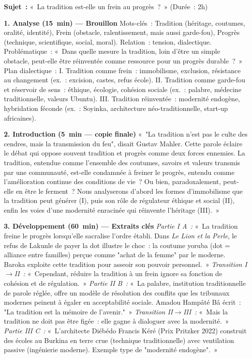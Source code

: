 \documentclass[11pt]{article}
\begin{document}
\begin{exoresolu}
\textbf{Sujet~:} «~La tradition est-elle un frein au progrès~?~» (Durée~: 2h)

\tcblower

\textbf{1. Analyse (15~min) — Brouillon}
Mots-clés~: Tradition (héritage, coutumes, oralité, identité), Frein (obstacle, ralentissement, mais aussi garde-fou), Progrès (technique, scientifique, social, moral). Relation~: tension, dialectique.
Problématique~: «~Dans quelle mesure la tradition, loin d'être un simple obstacle, peut-elle être réinventée comme ressource pour un progrès durable~?~»
Plan dialectique~:
I. Tradition comme frein~: immobilisme, exclusion, résistance au changement (ex.~: excision, castes, refus école).
II. Tradition comme garde-fou et réservoir de sens~: éthique, écologie, cohésion sociale (ex.~: palabre, médecine traditionnelle, valeurs Ubuntu).
III. Tradition réinventée~: modernité endogène, hybridation féconde (ex.~: Soyinka, architecture néo-traditionnelle, start-up africaines).

\textbf{2. Introduction (5~min — copie finale)}
«~"La tradition n'est pas le culte des cendres, mais la transmission du feu", disait Gustav Mahler. Cette parole éclaire le débat qui oppose souvent tradition et progrès comme deux forces ennemies. La tradition, entendue comme l'ensemble des coutumes, savoirs et valeurs transmis par une communauté, est-elle condamnée à freiner le progrès, entendu comme l'amélioration continue des conditions de vie~? Ou bien, paradoxalement, peut-elle en être le ferment~? Nous analyserons d'abord les formes d'immobilisme que la tradition peut générer (I), puis son rôle de régulateur éthique et social (II), enfin les voies d'une modernité enracinée qui réinvente l'héritage (III).~»

\textbf{3. Développement (60~min) — Extraits clés}
\textit{Partie I A~:} «~La tradition freine le progrès lorsqu'elle sacralise l'ordre établi. Dans \emph{Le Lion et la Perle}, le refus de Lakunle de payer la dot illustre le choc~: la coutume yoruba (dot = alliance entre familles) perçue comme "achat de la femme" par le moderne. Baroka exploite cette tradition pour asseoir son pouvoir personnel.~»
\textit{Transition I$\rightarrow$II~:} «~Cependant, réduire la tradition à un frein ignore sa fonction de cohésion et de régulation.~»
\textit{Partie II B~:} «~La palabre, institution traditionnelle de parole réglée, offre un modèle de résolution des conflits que les tribunaux modernes peinent à égaler en acceptabilité sociale. Amadou Hampâté Bâ écrit~: "La tradition est la mémoire de l'avenir."~»
\textit{Transition II$\rightarrow$III~:} «~Mais la tradition ne doit pas être figée~: elle gagne à dialoguer avec la modernité.~»
\textit{Partie III C~:} «~L'architecte Diébédo Francis Kéré (Prix Pritzker 2022) construit des écoles au Burkina en terre crue (technique traditionnelle) avec ventilation passive (ingénierie moderne). Exemple type de "modernité endogène".~»


\end{exoresolu}
\end{document}
